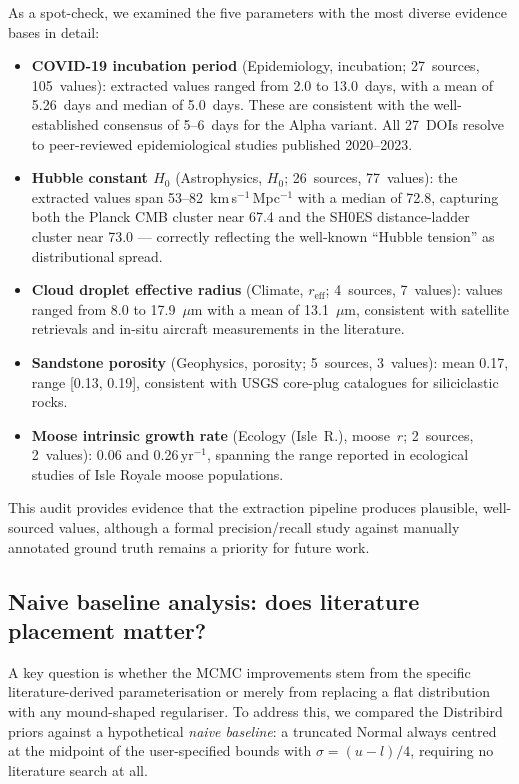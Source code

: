 \documentclass[11pt,a4paper]{article}
\begin{document}
As a spot-check, we examined the five parameters with the most diverse evidence bases in detail:

\begin{itemize}
  \item \textbf{COVID-19 incubation period} (Epidemiology, incubation; 27~sources, 105~values): extracted values ranged from 2.0 to 13.0~days, with a mean of 5.26~days and median of 5.0~days. These are consistent with the well-established consensus of 5--6~days for the Alpha variant. All 27~DOIs resolve to peer-reviewed epidemiological studies published 2020--2023.

  \item \textbf{Hubble constant $H_0$} (Astrophysics, $H_0$; 26~sources, 77~values): the extracted values span 53--82~km\,s$^{-1}$\,Mpc$^{-1}$ with a median of 72.8, capturing both the Planck CMB cluster near 67.4 and the SH0ES distance-ladder cluster near 73.0 --- correctly reflecting the well-known ``Hubble tension'' as distributional spread.

  \item \textbf{Cloud droplet effective radius} (Climate, $r_{\text{eff}}$; 4~sources, 7~values): values ranged from 8.0 to 17.9~$\mu$m with a mean of 13.1~$\mu$m, consistent with satellite retrievals and in-situ aircraft measurements in the literature.

  \item \textbf{Sandstone porosity} (Geophysics, porosity; 5~sources, 3~values): mean 0.17, range [0.13, 0.19], consistent with USGS core-plug catalogues for siliciclastic rocks.

  \item \textbf{Moose intrinsic growth rate} (Ecology (Isle~R.), moose~$r$; 2~sources, 2~values): 0.06 and 0.26\,yr$^{-1}$, spanning the range reported in ecological studies of Isle Royale moose populations.
\end{itemize}

\noindent This audit provides evidence that the extraction pipeline produces plausible, well-sourced values, although a formal precision/recall study against manually annotated ground truth remains a priority for future work.

\subsection{Naive baseline analysis: does literature placement matter?}

A key question is whether the MCMC improvements stem from the specific literature-derived parameterisation or merely from replacing a flat distribution with any mound-shaped regulariser. To address this, we compared the Distribird priors against a hypothetical \emph{naive baseline}: a truncated Normal always centred at the midpoint of the user-specified bounds with $\sigma = (u-l)/4$, requiring no literature search at all.
\end{document}
